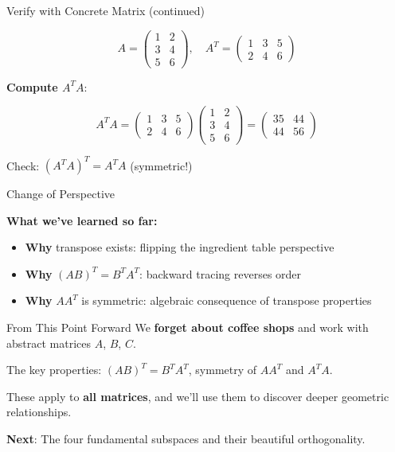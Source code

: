 \documentclass[10pt]{beamer}
\theoremstyle{definition}
\newcommand{\x}[1]{\alert{\textbf{#1}}}
\begin{document}
\begin{frame}{Verify with Concrete Matrix (continued)}

$$A = \begin{pmatrix} 1 & 2 \\ 3 & 4 \\ 5 & 6 \end{pmatrix}, \quad A^T = \begin{pmatrix} 1 & 3 & 5 \\ 2 & 4 & 6 \end{pmatrix}$$

\vspace{1em}

\x{Compute $A^T A$}:

$$A^T A = \begin{pmatrix} 1 & 3 & 5 \\ 2 & 4 & 6 \end{pmatrix} \begin{pmatrix} 1 & 2 \\ 3 & 4 \\ 5 & 6 \end{pmatrix} = \begin{pmatrix} 35 & 44 \\ 44 & 56 \end{pmatrix}$$

Check: $(A^T A)^T = A^T A$ \checkmark \quad (symmetric!)

\end{frame}

\begin{frame}{Change of Perspective}

\textbf{What we've learned so far:}

\begin{itemize}
\item \x{Why} transpose exists: flipping the ingredient table perspective
\item \x{Why} $(AB)^T = B^T A^T$: backward tracing reverses order
\item \x{Why} $AA^T$ is symmetric: algebraic consequence of transpose properties
\end{itemize}

\begin{alertblock}{From This Point Forward}
We \x{forget about coffee shops} and work with abstract matrices $A$, $B$, $C$.

The key properties: $(AB)^T = B^T A^T$, symmetry of $AA^T$ and $A^T A$.

These apply to \x{all matrices}, and we'll use them to discover deeper geometric relationships.
\end{alertblock}

\x{Next}: The four fundamental subspaces and their beautiful orthogonality.

\end{frame}
\end{document}
